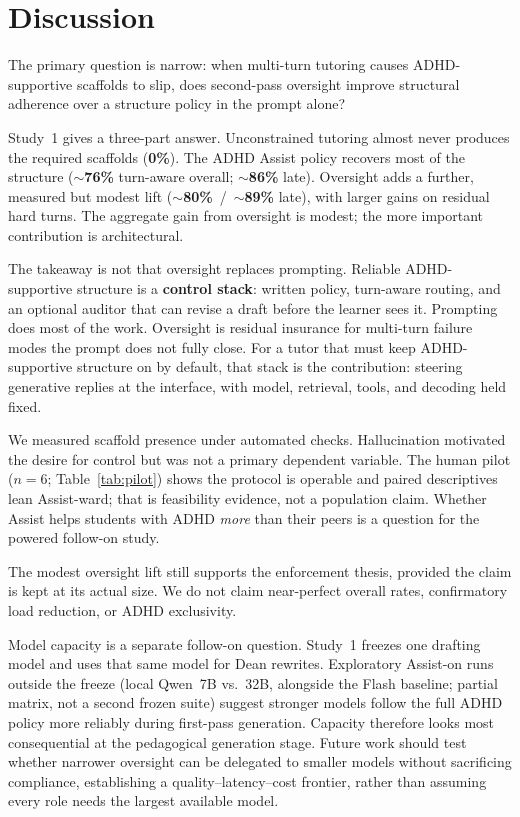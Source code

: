 \section{Discussion}
\label{sec:discussion}

The primary question is narrow: when multi-turn tutoring causes
ADHD-supportive scaffolds to slip, does second-pass oversight improve
structural adherence over a structure policy in the prompt alone?

Study~1 gives a three-part answer. Unconstrained tutoring almost never produces
the required scaffolds (\textbf{0\%}). The ADHD Assist policy recovers most of
the structure ($\sim$\textbf{76\%} turn-aware overall; $\sim$\textbf{86\%}
late). Oversight adds a further, measured but modest lift
($\sim$\textbf{80\%}~/~$\sim$\textbf{89\%} late), with larger gains on residual
hard turns. The aggregate gain from oversight is modest; the more important
contribution is architectural.

The takeaway is not that oversight replaces prompting. Reliable
ADHD-supportive structure is a \textbf{control stack}: written policy,
turn-aware routing, and an optional auditor that can revise a draft before the
learner sees it. Prompting does most of the work. Oversight is residual
insurance for multi-turn failure modes the prompt does not fully close. For a
tutor that must keep ADHD-supportive structure on by default, that stack is
the contribution: steering generative replies at the interface, with model,
retrieval, tools, and decoding held fixed.

We measured scaffold presence under automated checks. Hallucination motivated
the desire for control but was not a primary dependent variable. The human
pilot ($n{=}6$; Table~\ref{tab:pilot}) shows the protocol is operable and
paired descriptives lean Assist-ward; that is feasibility evidence, not a
population claim. Whether Assist helps students with ADHD \emph{more} than
their peers is a question for the powered follow-on study.

The modest oversight lift still supports the enforcement thesis, provided the
claim is kept at its actual size. We do not claim near-perfect overall rates,
confirmatory load reduction, or ADHD exclusivity.

Model capacity is a separate follow-on question. Study~1 freezes one drafting
model and uses that same model for Dean rewrites. Exploratory Assist-on runs
outside the freeze (local Qwen~7B vs.~32B, alongside the Flash baseline;
partial matrix, not a second frozen suite) suggest stronger models follow the
full ADHD policy more reliably during first-pass generation. Capacity
therefore looks most consequential at the pedagogical generation stage.
Future work should test whether narrower oversight can be delegated to smaller
models without sacrificing compliance, establishing a quality--latency--cost
frontier, rather than assuming every role needs the largest available model.
